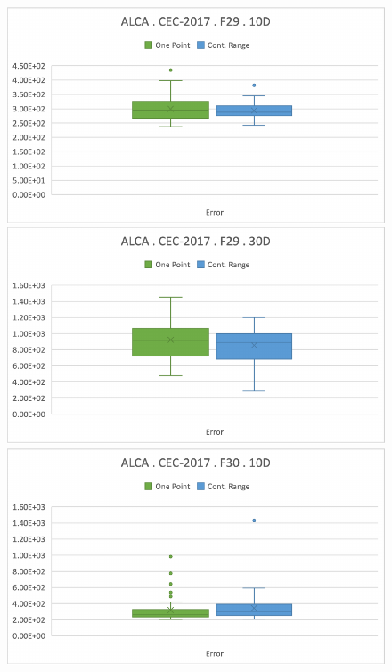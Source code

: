 \documentclass[graybox]{svmult}
\begin{document}
\begin{figure}[!ht]
\begin{minipage}[h]{0.49\linewidth}
        \end{minipage}
        \vfill
        \vspace{0.05 cm}
        \begin{minipage}[h]{0.49\linewidth}
            \includegraphics[width=1\linewidth]{img/fig_experiment_F29x10D.pdf} 
        \end{minipage}
        \hfill
        \begin{minipage}[h]{0.49\linewidth}
            \includegraphics[width=1\linewidth]{img/fig_experiment_F29x30D.pdf} 
        \end{minipage}
        \vfill
        \vspace{0.05 cm}
        \begin{minipage}[h]{0.49\linewidth}
            \includegraphics[width=1\linewidth]{img/fig_experiment_F30x10D.pdf} 

\end{minipage}
\end{figure}
\end{document}
